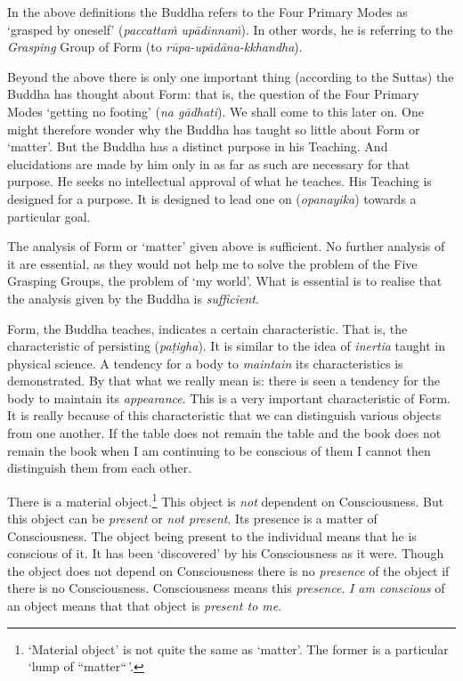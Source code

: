 In the above definitions the Buddha refers to the Four Primary Modes as `grasped by oneself' (\textit{paccattaṁ upādinnaṁ}). In other words, he is referring to the \emph{Grasping} Group of Form (to \textit{rūpa-upādāna-kkhandha}).

Beyond the above there is only one important thing (according to the Suttas) the Buddha has thought about Form: that is, the question of the Four Primary Modes `getting no footing' (\textit{na gādhati}). We shall come to this later on. One might therefore wonder why the Buddha has taught so little about Form or `matter'. But the Buddha has a distinct purpose in his Teaching. And elucidations are made by him only in as far as such are necessary for that purpose. He seeks no intellectual approval of what he teaches. His Teaching is designed for a purpose. It is designed to lead one on (\textit{opanayika}) towards a particular goal.

The analysis of Form or `matter' given above is sufficient. No further analysis of it are essential, as they would not help me to solve the problem of the Five Grasping Groups, the problem of `my world'. What is essential is to realise that the analysis given by the Buddha is \emph{sufficient}.

Form, the Buddha teaches, indicates a certain characteristic. That is, the characteristic of persisting (\textit{paṭigha}). It is similar to the idea of \emph{inertia} taught in physical science. A tendency for a body to \emph{maintain} its characteristics is demonstrated. By that what we really mean is: there is seen a tendency for the body to maintain its \emph{appearance}. This is a very important characteristic of Form. It is really because of this characteristic that we can distinguish various objects from one another. If the table does not remain the table and the book does not remain the book when I am continuing to be conscious of them I cannot then distinguish them from each other.

There is a material object.\footnote{`Material object' is not quite the same as `matter'. The former is a particular `lump of ``matter``\,'.} This object is \emph{not} dependent on Consciousness. But this object can be \emph{present} or \emph{not present}. Its presence is a matter of Consciousness. The object being present to the individual means that he is conscious of it. It has been `discovered' by his Consciousness as it were. Though the object does not depend on Consciousness there is no \emph{presence} of the object if there is no Consciousness. Consciousness means this \emph{presence}. \emph{I am conscious} of an object means that that object is \emph{present to me}.

